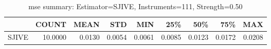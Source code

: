 \begin{table}[ht]
\centering
\caption{mse summary: Estimator=SJIVE, Instruments=111, Strength=0.50}
\begin{tabular}{lrrrrrrrr}
\toprule
 & COUNT & MEAN & STD & MIN & 25\% & 50\% & 75\% & MAX \\
\midrule
SJIVE & 10.0000 & 0.0130 & 0.0054 & 0.0061 & 0.0085 & 0.0123 & 0.0172 & 0.0208 \\
\bottomrule
\end{tabular}
\end{table}
